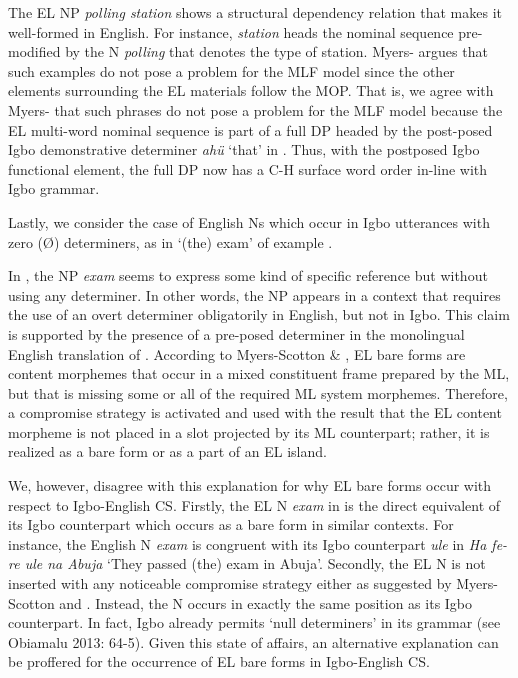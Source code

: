 \documentclass[output=paper]{langsci/langscibook}
\begin{document}
The EL NP \textit{polling station}\textbf{\textit{ }}shows a structural dependency relation that makes it well-formed in English. For instance, \textit{station }heads the nominal sequence pre-modified by the N \textit{polling }that denotes the type of station. Myers-\citet{Scotton2002} argues that such examples do not pose a problem for the MLF model since the other elements surrounding the EL materials follow the MOP. That is, we agree with Myers-\citet[139]{Scotton2002} that such phrases do not pose a problem for the MLF model because the EL multi-word nominal sequence is part of a full DP headed by the post-posed Igbo demonstrative determiner \textit{ahü} ‘that’ in . Thus, with the postposed Igbo functional element, the full DP now has a C-H surface word order in-line with Igbo grammar. 

Lastly, we consider the case of English Ns which occur in Igbo utterances with zero (Ø) determiners, as in ‘(the) exam’ of example . 

In , the NP \textit{exam }seems to express some kind of specific reference but without using any determiner. In other words, the NP appears in a context that requires the use of an overt determiner obligatorily in English, but not in Igbo. This claim is supported by the presence of a pre-posed determiner in the monolingual English translation of . According to Myers-Scotton \& \citet[106]{Jake2001}, EL bare forms are content morphemes that occur in a mixed constituent frame prepared by the ML, but that is missing some or all of the required ML system morphemes. Therefore, a compromise strategy is activated and used with the result that the EL content morpheme is not placed in a slot projected by its ML counterpart; rather, it is realized as a bare form or as a part of an EL island. 

We, however, disagree with this explanation for why EL bare forms occur with respect to Igbo-English CS. Firstly, the EL N \textit{exam }in  is the direct equivalent of its Igbo counterpart which occurs as a bare form in similar contexts. For instance, the English N \textit{exam }is congruent with its Igbo counterpart \textit{ule }in \textit{Ha fe-re ule na Abuja} ‘They passed (the) exam in Abuja’. Secondly, the EL N is not inserted with any noticeable compromise strategy either as suggested by Myers-Scotton and \citet[106]{Jake2001}. Instead, the N occurs in exactly the same position as its Igbo counterpart. In fact, Igbo already permits ‘null determiners’ in its grammar (see Obiamalu 2013: 64-5). Given this state of affairs, an alternative explanation can be proffered for the occurrence of EL bare forms in Igbo-English CS. 
\end{document}
